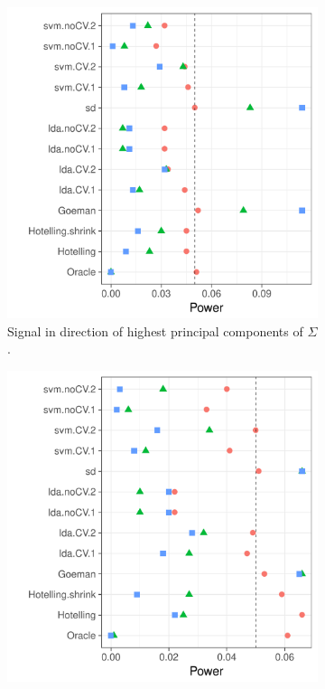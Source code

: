 \documentclass[12pt,a4paper]{article}
\begin{document}
\begin{figure}[h]
	\centering
	\caption{Long-memory Brownian motion correlation: $\Sigma=D^{-1} R D^{-1}$ where $D$ is diagonal with $D_{jj}=\sqrt{R_{jj}}$, and $R_{k,l}=\rho \min\{k,l\}; \rho=0.2$.}	
	\begin{subfigure}[t]{.3\textwidth}
		\centering
		\includegraphics[width=1\linewidth]{"art/file22"}
		\caption{Signal in direction of highest principal components of $\Sigma$.} 
		\label{fig:dependence_21}
	\end{subfigure}
	\begin{subfigure}[t]{.3\textwidth}
		\centering
		\includegraphics[width=1\linewidth]{"art/file23"}

\end{subfigure}
\end{figure}
\end{document}
